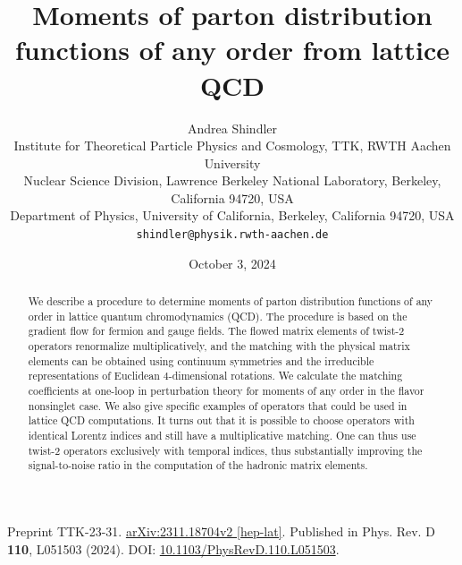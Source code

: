 \documentclass[11pt]{article}
\title{Moments of parton distribution functions of any order from lattice QCD}
\author{Andrea Shindler\\[2pt]
\small Institute for Theoretical Particle Physics and Cosmology, TTK, RWTH Aachen University\\
\small Nuclear Science Division, Lawrence Berkeley National Laboratory, Berkeley, California 94720, USA\\
\small Department of Physics, University of California, Berkeley, California 94720, USA\\
\small \texttt{shindler@physik.rwth-aachen.de}}
\date{October 3, 2024}
\begin{document}
\maketitle

\noindent
\small Preprint TTK-23-31. \href{https://arxiv.org/abs/2311.18704}{arXiv:2311.18704v2 [hep-lat]}.
Published in Phys. Rev. D \textbf{110}, L051503 (2024).
DOI: \href{https://doi.org/10.1103/PhysRevD.110.L051503}{10.1103/PhysRevD.110.L051503}.
\normalsize

\begin{abstract}
\noindent
We describe a procedure to determine moments of parton distribution
functions of any order in lattice quantum chromodynamics (QCD). The procedure is based on the gradient flow
for fermion and gauge fields. The flowed matrix
elements of twist-2 operators renormalize multiplicatively,
and the matching with the
physical matrix elements can be obtained using continuum
symmetries and the irreducible representations
of Euclidean $4$-dimensional rotations. We calculate
the matching coefficients at one-loop in perturbation theory
for moments of any order in the flavor nonsinglet case.
We also give specific examples
of operators that could be used in lattice QCD computations.
It turns out that it is possible to choose operators
with identical Lorentz indices
and still have a multiplicative matching. One can thus
use twist-2 operators exclusively with temporal indices,
thus substantially improving the
signal-to-noise ratio in the computation of the hadronic matrix elements.
\end{abstract}









\end{document}

